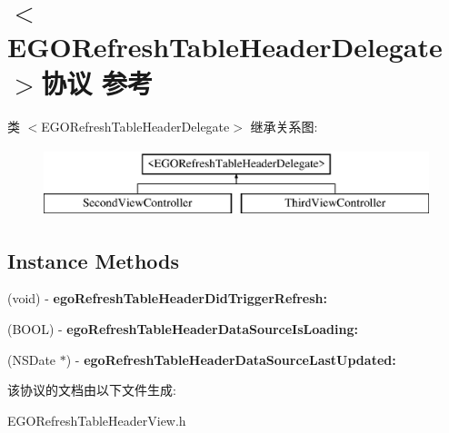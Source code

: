 \hypertarget{protocol_e_g_o_refresh_table_header_delegate-p}{\section{$<$E\-G\-O\-Refresh\-Table\-Header\-Delegate$>$协议 参考}
\label{protocol_e_g_o_refresh_table_header_delegate-p}
}
类 $<$E\-G\-O\-Refresh\-Table\-Header\-Delegate$>$ 继承关系图\-:\begin{figure}[H]
\begin{center}
\leavevmode
\includegraphics[height=2.000000cm]{protocol_e_g_o_refresh_table_header_delegate-p}
\end{center}
\end{figure}
\subsection*{Instance Methods}
\begin{DoxyCompactItemize}
\item 
\hypertarget{protocol_e_g_o_refresh_table_header_delegate-p_a3a71311636e9d10813ffeabe19d6adb7}{(void) -\/ {\bfseries ego\-Refresh\-Table\-Header\-Did\-Trigger\-Refresh\-:}}\label{protocol_e_g_o_refresh_table_header_delegate-p_a3a71311636e9d10813ffeabe19d6adb7}

\item 
\hypertarget{protocol_e_g_o_refresh_table_header_delegate-p_a6e51969fde015d59e9314a4ec41c21b8}{(B\-O\-O\-L) -\/ {\bfseries ego\-Refresh\-Table\-Header\-Data\-Source\-Is\-Loading\-:}}\label{protocol_e_g_o_refresh_table_header_delegate-p_a6e51969fde015d59e9314a4ec41c21b8}

\item 
\hypertarget{protocol_e_g_o_refresh_table_header_delegate-p_aaa03c7c1a490ebb17fcff24f7f1c5d35}{(N\-S\-Date $\ast$) -\/ {\bfseries ego\-Refresh\-Table\-Header\-Data\-Source\-Last\-Updated\-:}}\label{protocol_e_g_o_refresh_table_header_delegate-p_aaa03c7c1a490ebb17fcff24f7f1c5d35}

\end{DoxyCompactItemize}


该协议的文档由以下文件生成\-:\begin{DoxyCompactItemize}
\item 
E\-G\-O\-Refresh\-Table\-Header\-View.\-h\end{DoxyCompactItemize}
